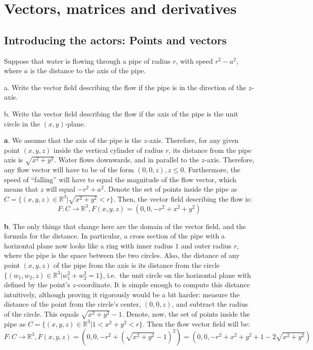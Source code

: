 \chapter{Vectors, matrices and derivatives}

\section{Introducing the actors: Points and vectors}

\begin{exercise}{8}
    Suppose that water is flowing through a pipe of radius $r$, with speed $r^2 - a^2$, where $a$ is the distance to the axis of the pipe.

    a. Write the vector field describing the flow if the pipe is in the direction of the $z$-axis.

    b. Write the vector field describing the flow if the axis of the pipe is the unit circle in the $(x, y)$-plane.
\end{exercise}

\begin{solution}

    \textbf{a}. We assume that the axis of the pipe is the $z$-axis. Therefore, for any given point $(x, y, z)$ inside the vertical cylinder of radius $r$, its distance from the pipe axis is $\sqrt{x^2+y^2}$. Water flows downwards, and in parallel to the $z$-axis. Therefore, any flow vector will have to be of the form $(0, 0, z), z \leq 0$. Furthermore, the speed of ``falling'' will have to equal the magnitude of the flow vector, which means that $z$ will equal $-r^2 + a^2$. Denote the set of points inside the pipe as $C = \{(x, y, z) \in \mathbb{R}^3 \lvert \sqrt{x^2+y^2} < r\}$. Then, the vector field describing the flow is:
    $$F: C \rightarrow \mathbb{R}^3, F(x, y, z) = (0, 0, - r^2 + x^2 + y^2)$$

    \textbf{b}. The only things that change here are the domain of the vector field, and the formula for the distance. In particular, a cross section of the pipe with a horizontal plane now looks like a ring with inner radius $1$ and outer radius $r$, where the pipe is the space between the two circles. Also, the distance of any point $(x, y, z)$ of the pipe from the axis is its distance from the circle $\{(w_1, w_2, z) \in \mathbb{R}^3 \lvert w_1^2 + w_2^2 = 1\}$, i.e.\ the unit circle on the horizontal plane with defined by the point's $z$-coordinate. It is simple enough to compute this distance intuitively, although proving it rigorously would be a bit harder: measure the distance of the point from the circle's center, $(0, 0, z)$, and subtract the radius of the circle. This equals $\sqrt{x^2 + y^2} - 1$. Denote, now, the set of points inside the pipe as $C = \{(x, y, z) \in \mathbb{R}^3 \lvert 1 < x^2+y^2 < r\}$. Then the flow vector field will be:
    $$F:C \rightarrow \mathbb{R}^3, F(x, y, z) = (0, 0, -r^2 +(\sqrt{x^2+y^2} - 1)^2) = (0, 0, -r^2 + x^2 + y^2 + 1 - 2\sqrt{x^2 + y^2})$$
\end{solution}

